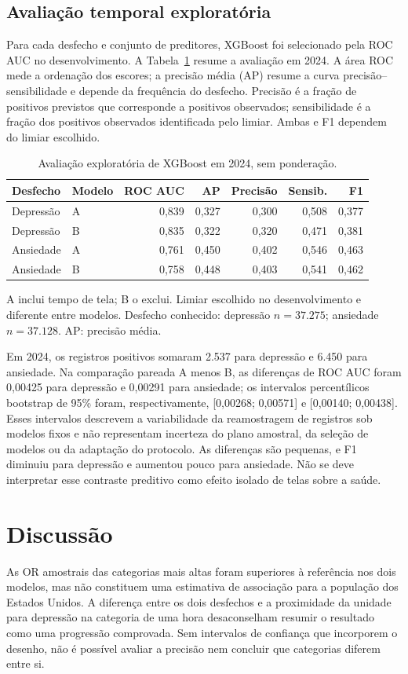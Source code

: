 ﻿\documentclass[12pt]{article}
\begin{document}
\subsection{Avaliação temporal exploratória}
Para cada desfecho e conjunto de preditores, XGBoost foi selecionado pela ROC AUC no desenvolvimento. A Tabela~\ref{tab:predicao} resume a avaliação em 2024. A área ROC mede a ordenação dos escores; a precisão média (AP) resume a curva precisão--sensibilidade e depende da frequência do desfecho. Precisão é a fração de positivos previstos que corresponde a positivos observados; sensibilidade é a fração dos positivos observados identificada pelo limiar. Ambas e F1 dependem do limiar escolhido.
\begin{table}[ht]
\centering
\caption{Avaliação exploratória de XGBoost em 2024, sem ponderação.}
\label{tab:predicao}
\begin{tabular}{llrrrrr}\hline
Desfecho & Modelo & ROC AUC & AP & Precisão & Sensib. & F1 \\\hline
Depressão & A & 0,839 & 0,327 & 0,300 & 0,508 & 0,377 \\
Depressão & B & 0,835 & 0,322 & 0,320 & 0,471 & 0,381 \\
Ansiedade & A & 0,761 & 0,450 & 0,402 & 0,546 & 0,463 \\
Ansiedade & B & 0,758 & 0,448 & 0,403 & 0,541 & 0,462 \\\hline
\end{tabular}

\smallskip\footnotesize A inclui tempo de tela; B o exclui. Limiar escolhido no desenvolvimento e diferente entre modelos. Desfecho conhecido: depressão $n=37.275$; ansiedade $n=37.128$. AP: precisão média.
\end{table}

Em 2024, os registros positivos somaram 2.537 para depressão e 6.450 para ansiedade. Na comparação pareada A menos B, as diferenças de ROC AUC foram 0,00425 para depressão e 0,00291 para ansiedade; os intervalos percentílicos bootstrap de 95\% foram, respectivamente, [0,00268; 0,00571] e [0,00140; 0,00438]. Esses intervalos descrevem a variabilidade da reamostragem de registros sob modelos fixos e não representam incerteza do plano amostral, da seleção de modelos ou da adaptação do protocolo. As diferenças são pequenas, e F1 diminuiu para depressão e aumentou pouco para ansiedade. Não se deve interpretar esse contraste preditivo como efeito isolado de telas sobre a saúde.

\section{Discussão}
As OR amostrais das categorias mais altas foram superiores à referência nos dois modelos, mas não constituem uma estimativa de associação para a população dos Estados Unidos. A diferença entre os dois desfechos e a proximidade da unidade para depressão na categoria de uma hora desaconselham resumir o resultado como uma progressão comprovada. Sem intervalos de confiança que incorporem o desenho, não é possível avaliar a precisão nem concluir que categorias diferem entre si.
\end{document}
